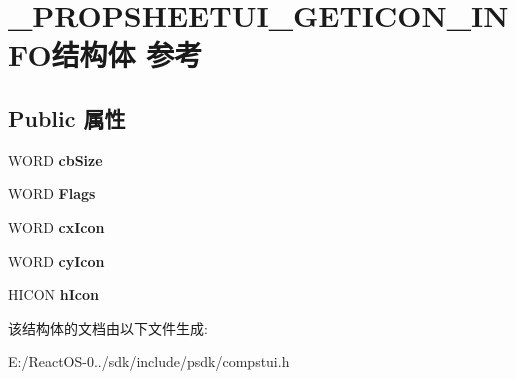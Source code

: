 \hypertarget{struct___p_r_o_p_s_h_e_e_t_u_i___g_e_t_i_c_o_n___i_n_f_o}{}\section{\+\_\+\+P\+R\+O\+P\+S\+H\+E\+E\+T\+U\+I\+\_\+\+G\+E\+T\+I\+C\+O\+N\+\_\+\+I\+N\+F\+O结构体 参考}
\label{struct___p_r_o_p_s_h_e_e_t_u_i___g_e_t_i_c_o_n___i_n_f_o}
\subsection*{Public 属性}
\begin{DoxyCompactItemize}
\item 
\mbox{\label{struct___p_r_o_p_s_h_e_e_t_u_i___g_e_t_i_c_o_n___i_n_f_o_a826da05c79dc184374a98bac33e9645d}} 
W\+O\+RD {\bfseries cb\+Size}
\item 
\mbox{\label{struct___p_r_o_p_s_h_e_e_t_u_i___g_e_t_i_c_o_n___i_n_f_o_a2eb755db562c18f297e8521c9d1945db}} 
W\+O\+RD {\bfseries Flags}
\item 
\mbox{\label{struct___p_r_o_p_s_h_e_e_t_u_i___g_e_t_i_c_o_n___i_n_f_o_abb2c5670eeb67fbc602e564bf6dcab34}} 
W\+O\+RD {\bfseries cx\+Icon}
\item 
\mbox{\label{struct___p_r_o_p_s_h_e_e_t_u_i___g_e_t_i_c_o_n___i_n_f_o_a1524085248857be52e6c4f4e6b8cc50a}} 
W\+O\+RD {\bfseries cy\+Icon}
\item 
\mbox{\label{struct___p_r_o_p_s_h_e_e_t_u_i___g_e_t_i_c_o_n___i_n_f_o_aaab364c498507467c4a7039073b416fc}} 
H\+I\+C\+ON {\bfseries h\+Icon}
\end{DoxyCompactItemize}


该结构体的文档由以下文件生成\+:\begin{DoxyCompactItemize}
\item 
E\+:/\+React\+O\+S-\/0../sdk/include/psdk/compstui.\+h\end{DoxyCompactItemize}
